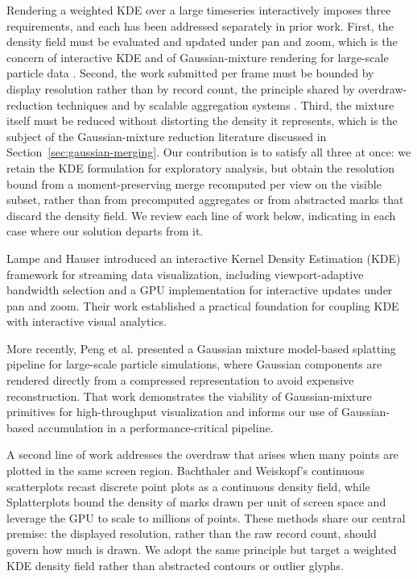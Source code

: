 \documentclass[10pt,conference]{IEEEtran}
\begin{document}
Rendering a weighted KDE over a large timeseries interactively imposes three requirements, and each has been addressed separately in prior work. First, the density field must be evaluated and updated under pan and zoom, which is the concern of interactive KDE \cite{5742387} and of Gaussian-mixture rendering for large-scale particle data \cite{article}. Second, the work submitted per frame must be bounded by display resolution rather than by record count, the principle shared by overdraw-reduction techniques \cite{4658159,10.1109/TVCG.2013.65} and by scalable aggregation systems \cite{10.1111/cgf.12129,10.1109/TVCG.2013.179}. Third, the mixture itself must be reduced without distorting the density it represents, which is the subject of the Gaussian-mixture reduction literature discussed in Section~\ref{sec:gaussian-merging}. Our contribution is to satisfy all three at once: we retain the KDE formulation for exploratory analysis, but obtain the resolution bound from a moment-preserving merge recomputed per view on the visible subset, rather than from precomputed aggregates or from abstracted marks that discard the density field. We review each line of work below, indicating in each case where our solution departs from it.

Lampe and Hauser \cite{5742387} introduced an interactive Kernel Density Estimation (KDE) framework for streaming data visualization, including viewport-adaptive bandwidth selection and a GPU implementation for interactive updates under pan and zoom. Their work established a practical foundation for coupling KDE with interactive visual analytics.

More recently, Peng et al. \cite{article} presented a Gaussian mixture model-based splatting pipeline for large-scale particle simulations, where Gaussian components are rendered directly from a compressed representation to avoid expensive reconstruction. That work demonstrates the viability of Gaussian-mixture primitives for high-throughput visualization and informs our use of Gaussian-based accumulation in a performance-critical pipeline.

A second line of work addresses the overdraw that arises when many points are plotted in the same screen region. Bachthaler and Weiskopf's continuous scatterplots \cite{4658159} recast discrete point plots as a continuous density field, while Splatterplots \cite{10.1109/TVCG.2013.65} bound the density of marks drawn per unit of screen space and leverage the GPU to scale to millions of points. These methods share our central premise: the displayed resolution, rather than the raw record count, should govern how much is drawn. We adopt the same principle but target a weighted KDE density field rather than abstracted contours or outlier glyphs.
\end{document}
